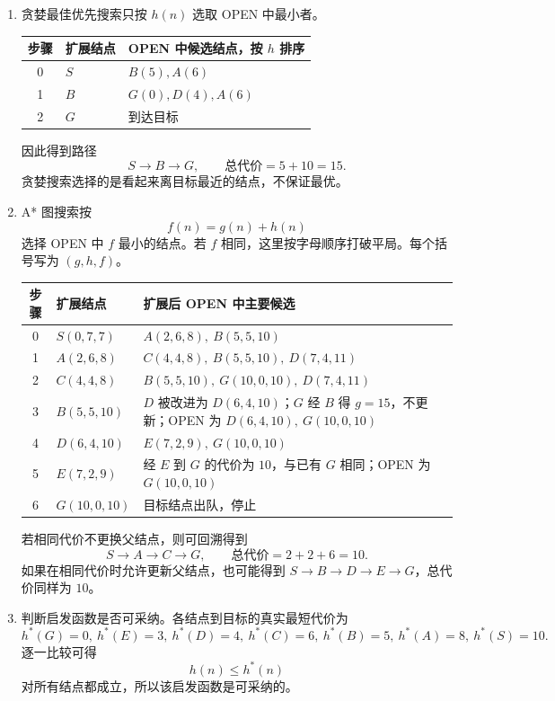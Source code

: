 \documentclass[UTF8,zihao=-4]{ctexart}
\begin{document}
\begin{enumerate}[label=(\arabic*)]
\item 贪婪最佳优先搜索只按 $h(n)$ 选取 OPEN 中最小者。

\begin{center}
\begin{tabular}{c l l}
\toprule
步骤 & 扩展结点 & OPEN 中候选结点，按 $h$ 排序 \\
\midrule
0 & $S$ & $B(5), A(6)$ \\
1 & $B$ & $G(0), D(4), A(6)$ \\
2 & $G$ & 到达目标 \\
\bottomrule
\end{tabular}
\end{center}

因此得到路径
\[
S\to B\to G,\qquad \text{总代价}=5+10=15.
\]
贪婪搜索选择的是看起来离目标最近的结点，不保证最优。

\item A* 图搜索按
\[
f(n)=g(n)+h(n)
\]
选择 OPEN 中 $f$ 最小的结点。若 $f$ 相同，这里按字母顺序打破平局。每个括号写为 $(g,h,f)$。

\begin{center}
\footnotesize
\begin{tabularx}{\linewidth}{c >{\centering\arraybackslash}p{2.6cm} >{\raggedright\arraybackslash}X}
\toprule
步骤 & 扩展结点 & 扩展后 OPEN 中主要候选 \\
\midrule
0 & $S(0,7,7)$ & $A(2,6,8),\ B(5,5,10)$ \\
1 & $A(2,6,8)$ & $C(4,4,8),\ B(5,5,10),\ D(7,4,11)$ \\
2 & $C(4,4,8)$ & $B(5,5,10),\ G(10,0,10),\ D(7,4,11)$ \\
3 & $B(5,5,10)$ & $D$ 被改进为 $D(6,4,10)$；$G$ 经 $B$ 得 $g=15$，不更新；OPEN 为 $D(6,4,10),\ G(10,0,10)$ \\
4 & $D(6,4,10)$ & $E(7,2,9),\ G(10,0,10)$ \\
5 & $E(7,2,9)$ & 经 $E$ 到 $G$ 的代价为 $10$，与已有 $G$ 相同；OPEN 为 $G(10,0,10)$ \\
6 & $G(10,0,10)$ & 目标结点出队，停止 \\
\bottomrule
\end{tabularx}
\end{center}

若相同代价不更换父结点，则可回溯得到
\[
S\to A\to C\to G,\qquad \text{总代价}=2+2+6=10.
\]
如果在相同代价时允许更新父结点，也可能得到 $S\to B\to D\to E\to G$，总代价同样为 $10$。

\item 判断启发函数是否可采纳。各结点到目标的真实最短代价为
\[
h^*(G)=0,\ h^*(E)=3,\ h^*(D)=4,\ h^*(C)=6,\ h^*(B)=5,\ h^*(A)=8,\ h^*(S)=10.
\]
逐一比较可得
\[
h(n)\le h^*(n)
\]
对所有结点都成立，所以该启发函数是可采纳的。


\end{enumerate}
\end{document}
